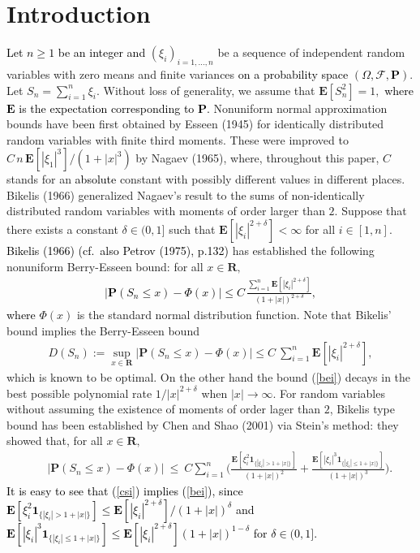 \documentclass{gSTA2e}
\theoremstyle{plain}
\theoremstyle{definition}
\theoremstyle{remark}
\begin{document}
\section{Introduction}
\textcolor{black}{Let $n\geq 1$ be an integer and} $(\xi_{i})_{i=1,...,n}$ be a sequence of independent
random variables with zero means and finite variances \textcolor{black}{on a
 probability space $(\Omega ,\mathcal{F},\mathbf{P})$}.
 Let $S_n=\sum_{i=1}^n\xi_i.$
Without loss of generality, we assume that $\mathbf{E}[S_n^2]=1,$
\textcolor{black}{where $\mathbf{E}$ is the expectation corresponding to $\mathbf{P}.$}
Nonuniform normal approximation bounds have been first obtained by Esseen (1945) for
identically distributed random variables with finite third moments. These were improved
to $C\, n\, \mathbf{E} [|\xi_1|^{3} ] /(1+|x|^3)$ by Nagaev (1965), where, throughout this paper, $C$ stands for an \textcolor{black}{absolute}  constant with possibly different values in different places.
Bikelis (1966) generalized Nagaev's result to the sums of non-identically distributed random variables with moments of order larger than $2$.
Suppose that there exists a constant $\delta \in (0, 1]$ such that $\mathbf{E} [|\xi_i|^{2+\delta} ]< \infty$ for all $i \in [1,n].$
\textcolor{black}{Bikelis (1966) (cf.\ also Petrov (1975), p.132)} has established the following nonuniform Berry-Esseen bound: for all $x \in \mathbf{R},$
\textcolor{black}{\begin{eqnarray}
\Big|\mathbf{P}(S_n\leq x) - \Phi(x)\Big| \leq  C\,\frac{\sum_{i=1}^n\mathbf{E}[|\xi_i|^{2+\delta}]}{(1+|x|)^{2+\delta}},\label{bei}
\end{eqnarray}
where} $\Phi(x)$ is the standard normal distribution function.
 Note that Bikelis'  bound implies the Berry-Esseen bound
\begin{eqnarray}
D(S_n)  := \sup_{x \in \mathbf{R}} \Big|\mathbf{P}(S_n\leq x) - \Phi(x) \Big| \leq C\ \sum_{i=1}^n\mathbf{E}[|\xi_i|^{2+\delta}],
\end{eqnarray}
which is known to be optimal.
On the other hand
the  bound (\ref{bei}) decays in the best possible polynomial rate $1/|x|^{2+\delta}$ when $|x|\rightarrow \infty.$
For random variables without assuming the existence of moments of order lager than $2$,
\mbox{Bikelis} type bound has been established by Chen and Shao (2001) via Stein's
method: they showed that, for all $x \in \mathbf{R},$
\begin{eqnarray}\label{csi}
&&\Big|\mathbf{P}(S_n\leq x) - \Phi(x) \Big|  \ \leq \ C \sum_{i=1}^n \bigg( \frac{\mathbf{E}[\xi_i^2\mathbf{1}_{\{|\xi_i|>1+|x|\}}]}{(1+|x|)^2} + \frac{\mathbf{E}[|\xi_i|^3\mathbf{1}_{ \{|\xi_i| \leq 1+|x| \}}] }{(1+|x|)^3}\bigg).
\end{eqnarray}
\textcolor{black}{It is easy to see that (\ref{csi}) implies (\ref{bei}), since
$\mathbf{E}[\xi_i^2\mathbf{1}_{\{|\xi_i|>1+|x|\}}]\leq \mathbf{E}[|\xi_i|^{2+\delta}] / (1+|x|)^\delta$
and
$\mathbf{E}[|\xi_i|^3\mathbf{1}_{\{|\xi_i|\leq 1+|x|\}}]   \leq \mathbf{E}[|\xi_i|^{2+\delta}]   (1+|x|)^{1-\delta}$
for $\delta \in (0,1].$}
\end{document}
